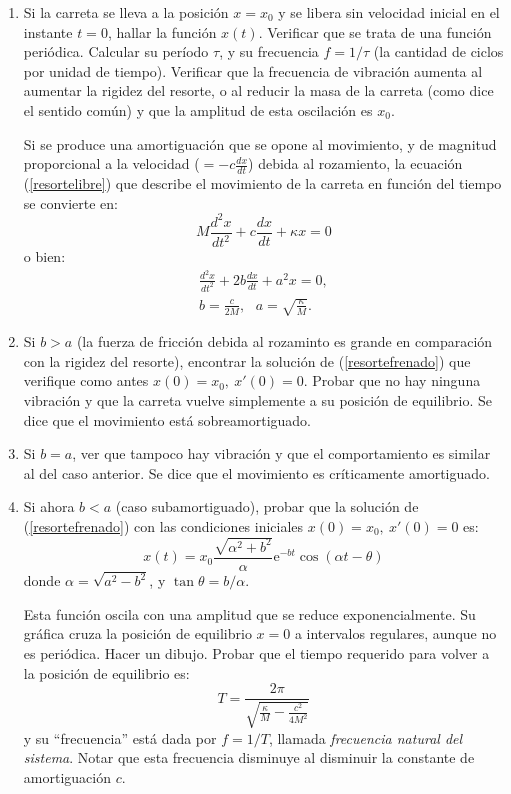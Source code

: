 \documentclass[11pt,a4paper,pdftex]{amsart}
\numberwithin{equation}{section}%
\newcommand{\0}{\mathbb O}
\newcommand{\8}{\infty}
\begin{document}
\begin{enumerate}
\item Si la carreta se lleva a la posición $x=x_{0}$ y se libera sin velocidad
inicial en el instante $t=0$, hallar la función $x(t)$. Verificar
que se trata de una función peri\'odica. Calcular su período $\tau$, y
su frecuencia $f= 1/\tau$ (la cantidad de ciclos por unidad de tiempo).
Verificar que la frecuencia de vibraci\'on aumenta al aumentar la rigidez
del resorte, o al reducir la masa de la carreta (como dice el sentido
com\'un) y que la amplitud de esta oscilaci\'on es $x_{0}$.

\medskip

Si se produce una amortiguaci\'on que se opone al movimiento, y de magnitud
proporcional a la velocidad ($=-c \frac{dx}{dt}$) debida al rozamiento,
la ecuaci\'on (\ref{resortelibre}) que describe el movimiento de la carreta
en funci\'on del tiempo se convierte en:
\[ M \frac{d^{2}x}{dt^{2}} + c \frac{dx}{dt} + \kappa x =0\]
o bien:
\begin{eqnarray}
\frac{d^{2}x}{dt^{2}}+2b\frac{dx}{dt}+a^{2}x=0,  \label{resortefrenado}\\
b=\frac{c}{2M},\ \ \ a=\sqrt{\frac{\kappa}{M}}. \nonumber
\end{eqnarray}

\item Si $b>a$ (la fuerza de fricci\'on debida al rozaminto es grande en
comparaci\'on con la rigidez del resorte), encontrar la soluci\'on de
(\ref{resortefrenado}) que verifique como antes $x(0)=x_{0},\ x'(0)=0 $.
Probar que no hay ninguna vibraci\'on y que la carreta vuelve simplemente
a su posici\'on de equilibrio. Se dice que el movimiento est\'a
sobreamortiguado.


\item Si $b=a$, ver que tampoco hay vibraci\'on y que el comportamiento es similar
al del caso anterior. Se dice que el movimiento es críticamente amortiguado.

\item Si ahora $b<a$ (caso subamortiguado), probar que la soluci\'on de
(\ref{resortefrenado}) con las condiciones iniciales $x(0)=x_{0},\ x'(0)=0 $
es:
\begin{equation}
 x(t)= x_{0} \frac{\sqrt{\alpha ^{2} + b^{2}}}{\alpha} \mbox{e}^{-bt}
\cos (\alpha t - \theta)
\end{equation}
donde $\alpha = \sqrt{a^{2}-b^{2}}$, y $\tan\theta= b/\alpha$.

Esta funci\'on oscila con una amplitud que se reduce exponencialmente.
Su gr\'afica cruza la posici\'on de equilibrio $x=0$ a intervalos regulares,
aunque no es peri\'odica. Hacer un dibujo. Probar que el tiempo requerido
para volver a la posici\'on de equilibrio es:
\[ T=\frac{2 \pi}{\sqrt{\frac{\kappa}{M}-\frac{c^{2}}{4 M^{2}}}} \]
y su ``frecuencia'' est\'a dada por $f=1/T$, llamada {\it frecuencia natural del
sistema}. Notar que esta frecuencia disminuye al disminuir la constante
de amortiguaci\'on $c$.



\end{enumerate}
\end{document}
